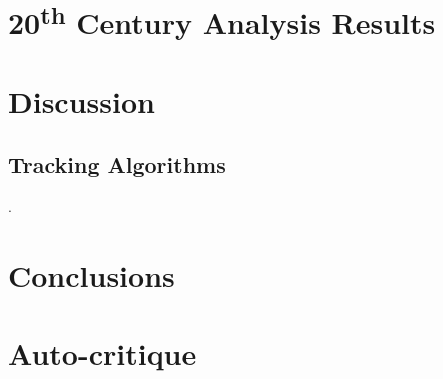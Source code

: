 \documentclass[pdftex,12pt,a4paper]{report}
\newcommand{\ts}{\textsuperscript}
\begin{document}
\chapter{20\ts{th} Century Analysis Results}
\label{chap:results_analysis}

\chapter{Discussion}
\label{chap:discussion}

\section{Tracking Algorithms}
\label{sec:discussion_tracking_algs}.

\chapter{Conclusions}
\label{chap:conclusion}

\chapter*{Auto-critique}

\printbibliography[title={References}]

\end{document}
